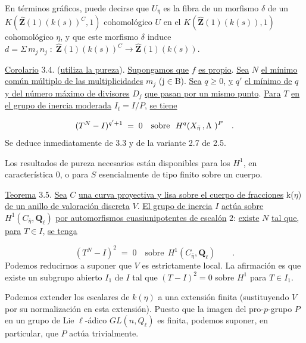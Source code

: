 En términos gráficos, puede decirse que $U_{\bar{\eta}}$ es la fibra de un morfismo $\delta$ de un $K(\hat{\mathbf{Z}}(1)(k(s))^{C},1)$ cohomológico $U$ en el $K(\hat{\mathbf{Z}}(1)(k(s)),1)$ cohomológico $\eta$, y que este morfismo $\delta$ induce $d = \Sigma\, m_{j}\, n_{j} \;:\; \hat{\mathbf{Z}}(1)(k(s))^{C} \longrightarrow \hat{\mathbf{Z}}(1)(k(s))$.

\underline{Corolario} 3.4. (\underline{utiliza la pureza}). \underline{Supongamos que} $f$ \underline{es propio}. \underline{Sea} $N$ \underline{el mínimo común múltiplo de las multiplicidades} $m_{j}$ (j$\in$B). \underline{Sea} $q \geqslant 0$, \underline{y} $q'$ \underline{el mínimo de} $q$ \underline{y del número máximo de divisores} $D_{j}$ \underline{que pasan por un mismo punto}. \underline{Para} $T$ \underline{en el grupo de inercia moderada} $I_{t} =I/P$, \underline{se tiene}

\begin{equation*}
(T^{N} - I)^{\sisi{q'}{q'+1}} \;=\; 0 \quad \underline{\text{sobre}} \ \ H^{q}(X_{\bar{\eta}} \,,\Lambda\ )^{P} \quad .
\end{equation*}
Se deduce inmediatamente de 3.3 y de la variante 2.7 de 2.5.

Los resultados de pureza necesarios están disponibles para los $H^{1}$, en característica $0$, o para $S$ esencialmente de tipo finito sobre un cuerpo.

\underline{Teorema} 3.5. \underline{Sea} $C$ \underline{una curva proyectiva y lisa sobre el cuerpo de fracciones} k($\eta$) \underline{de un anillo de valoración discreta} $V$. \underline{El grupo de inercia} $I$ \underline{actúa sobre} $H^{1}(C_{\bar{\eta}},\mathbf{Q}_{\ell})$ \underline{por automorfismos cuasiunipotentes de escalón} $2$: \underline{existe} $N$ \underline{tal que,} \underline{para} $T \in I$, \underline{se tenga}

\begin{equation*}
(T^{N} - I)^{2} \;=\; 0 \quad \text{sobre} \ \ H^{1}(C_{\bar{\eta}},\mathbf{Q}_{\ell}) \qquad .
\end{equation*}
Podemos reducirnos a suponer que $V$ es estrictamente local. La afirmación es que existe un subgrupo abierto $I_{1}$ de $I$ tal que $(T - I)^{2} = 0$ sobre $H^{1}$ para $T \in I_{1}$.


Podemos extender los escalares de $k(\eta)$ a una extensión finita (sustituyendo $V$ por su normalización en esta extensión). Puesto que la imagen del pro-$p$-grupo $P$ en un grupo de Lie $\ell$-ádico $GL(n,Q_\ell)$ es finita, podemos suponer, en particular, que $P$ actúa trivialmente.

